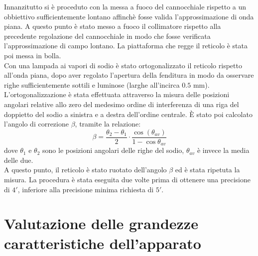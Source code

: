 \documentclass{article}
\begin{document}
        Innanzitutto si è proceduto con la messa a fuoco del cannocchiale rispetto a un obbiettivo sufficientemente lontano affinchè 
        fosse valida l'approssimazione di onda piana. A questo punto è stato messo a fuoco il collimatore rispetto alla precedente regolazione
        del cannocchiale in modo che fosse verificata l'approssimazione di campo lontano. La piattaforma che regge il reticolo è stata poi messa in bolla. \\
        Con una lampada ai vapori di sodio è stato ortogonalizzato il reticolo rispetto all'onda piana, dopo aver regolato l'apertura della fenditura 
        in modo da osservare righe sufficientemente sottili e luminose (larghe all'incirca $0.5$ mm). 
        L'ortogonalizzazione è stata effettuata attraverso la misura delle posizioni angolari relative allo zero del medesimo ordine di interferenza 
        di una riga del doppietto del sodio a sinistra e a destra dell'ordine centrale.
        È stato poi calcolato l'angolo di correzione $\beta$, tramite la relazione:
            \[ \beta = \frac{\theta_2 - \theta_1}{2} \cdot \frac{\cos(\theta_{av})}{1 - \cos\theta_{av}} \]
        dove $\theta_1$ e $\theta_2$ sono le posizioni angolari delle righe del sodio, $\theta_{av}$ è invece la media delle due. \\
        A questo punto, il reticolo è stato ruotato dell'angolo $\beta$ ed è stata ripetuta la misura. La procedura è stata eseguita due volte prima di 
        ottenere una precisione di $4'$, inferiore alla precisione minima richiesta di $5'$. \\ 


    \section{Valutazione delle grandezze caratteristiche dell'apparato}
\end{document}
